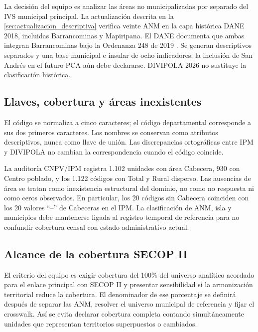 La decisión del equipo es analizar las áreas no municipalizadas por separado del IVS municipal principal. La actualización descrita en la \cref{sec:actualizacion_descriptiva} verifica veinte ANM en la capa histórica DANE 2018, incluidas Barrancominas y Mapiripana. El DANE documenta que ambas integran Barrancominas bajo la Ordenanza 248 de 2019 \citep{dane2018divipola,dane_nbi_barrancominas}. Se generan descriptivos separados y una base municipal e insular de ocho indicadores; la inclusión de San Andrés en el futuro PCA aún debe declararse. DIVIPOLA 2026 no sustituye la clasificación histórica.

\subsection{Llaves, cobertura y áreas inexistentes}

El código se normaliza a cinco caracteres; el código departamental corresponde a sus dos primeros caracteres. Los nombres se conservan como atributos descriptivos, nunca como llave de unión. Las discrepancias ortográficas entre IPM y DIVIPOLA no cambian la correspondencia cuando el código coincide.

La auditoría CNPV/IPM registra 1.102 unidades con área Cabecera, 930 con Centro poblado, y los 1.122 códigos con Total y Rural disperso. Las ausencias de área se tratan como inexistencia estructural del dominio, no como no respuesta ni como ceros observados. En particular, los 20 códigos sin Cabecera coinciden con los 20 valores \enquote{--} de Cabeceras en el IPM. La clasificación de ANM, isla y municipios debe mantenerse ligada al registro temporal de referencia para no confundir cobertura censal con estado administrativo actual.

\subsection{Alcance de la cobertura SECOP II}

El criterio del equipo es exigir cobertura del 100\% del universo analítico acordado para el enlace principal con SECOP II y presentar sensibilidad si la armonización territorial reduce la cobertura. El denominador de ese porcentaje se definirá después de separar las ANM, resolver el universo municipal de referencia y fijar el crosswalk. Así se evita declarar cobertura completa contando simultáneamente unidades que representan territorios superpuestos o cambiados.
